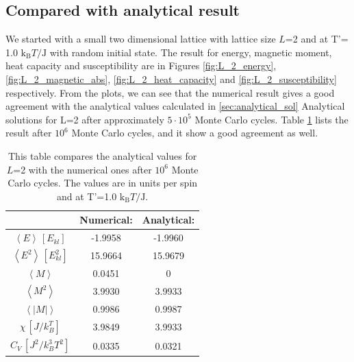 \subsection{Compared with analytical result}

We started with a small two dimensional lattice with lattice size $L$=2 and at T'= 1.0 $\text{k}_\text{B}T/\text{J}$ with random initial state. The result for energy, magnetic moment, heat capacity and susceptibility are in Figures \ref{fig:L_2_energy}, \ref{fig:L_2_magnetic_abs}, \ref{fig:L_2_heat_capacity} and \ref{fig:L_2_susceptibility} respectively. From the plots, we can see that the numerical result gives a good agreement with the analytical values calculated in \ref{sec:analytical_sol} Analytical solutions for L=2 after approximately $5\cdot 10^5$ Monte Carlo cycles. Table \ref{tab:compare_values} lists the result after $10^6$ Monte Carlo cycles, and it show a good agreement as well. 

\begin{table}[H]\caption{This table compares the analytical values for $L$=2 with the numerical ones after $10^6$ Monte Carlo cycles. The values are in units per spin and at T'=1.0 $\text{k}_\text{B}T/\text{J}$.}\label{tab:compare_values}
\begin{tabular}{ccc}
& Numerical: & Analytical:\\ \hline
$\left<E\right>\, [E_{kl}]$ &   -1.9958 & -1.9960\\
$\left<E^2\right>\, [E_{kl}^2]$ &   15.9664 & 15.9679\\
$\left<M\right>$ &    0.0451 & 0\\
$\left<M^2\right>$ &    3.9930 & 3.9933\\
$\left<|M|\right>$ &    0.9986 & 0.9987\\
$\chi \, [J/k_B^T]$ &   3.9849 & 3.9933\\
$C_V \, [J^2/k_B^3T^2]$& 0.0335 & 0.0321\\
\end{tabular}
\end{table}

